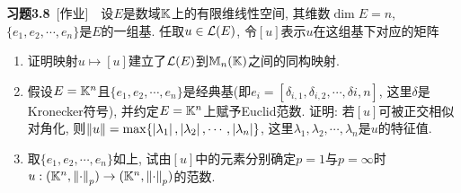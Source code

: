 	\textbf{习题3.8}\ [作业]\ \ 设$ E $是数域$ \mathbb{K} $上的有限维线性空间, 其维数$ \dim E=n $, $ \{ e_1,e_2,\cdots,e_n \} $是$ E $的一组基. 任取$ u\in\mathcal{L}(E) $, 令$ [u] $表示$ u $在这组基下对应的矩阵
	\begin{enumerate}[(1)]
	\item 证明映射$ u\mapsto[u] $建立了$ \mathcal{L}(E) $到$ \mathbb{M}_n(\mathbb{K}) $之间的同构映射.
	\item 假设$ E=\mathbb{K}^n $且$ \{ e_1,e_2,\cdots,e_n \} $是经典基(即$ e_i=[\delta_{i,1},\delta_{i,2},\cdots,\delta{i,n}] $, 这里$ \delta $是Kronecker符号), 并约定$ E=\mathbb{K}^n $上赋予Euclid范数. 证明: 若$ [u] $可被正交相似对角化, 则$ \left\| u \right\|=\max\{ \left| \lambda_1 \right| ,\left| \lambda_2 \right| ,\cdots,\left| \lambda_n \right|  \} $, 这里$ \lambda_1,\lambda_2,\cdots,\lambda_n $是$ u $的特征值.
	\item 取$ \{ e_1,e_2,\cdots,e_n \} $如上, 试由$ [u] $中的元素分别确定$ p=1 $与$ p=\infty $时$ u : (\mathbb{K}^n,\left\| \cdot \right\|_p)\to(\mathbb{K}^n,\left\| \cdot \right\|_p) $的范数.
	\end{enumerate}
